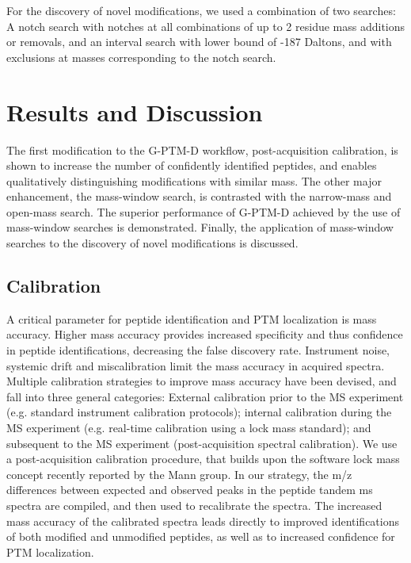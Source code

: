 \documentclass[journal=jprobs,manuscript=article]{achemso}
\begin{document}
For the discovery of novel modifications, we used a combination of two searches: A notch search with notches at all combinations of up to 2 residue mass additions or removals, and an interval search with lower bound of -187 Daltons, and with exclusions at masses corresponding to the notch search.

\section{Results and Discussion}




The first modification to the G-PTM-D workflow, post-acquisition calibration, is shown to increase the number of confidently identified peptides, and enables qualitatively distinguishing modifications with similar mass.
The other major enhancement, the mass-window search, is contrasted with the narrow-mass and open-mass search.
The superior performance of G-PTM-D achieved by the use of mass-window searches is demonstrated.
Finally, the application of mass-window searches to the discovery of novel modifications is discussed.

\subsection{Calibration}

A critical parameter for peptide identification and PTM localization is mass accuracy\cite{Scherl_2008}.
Higher mass accuracy provides increased specificity and thus confidence in peptide identifications, decreasing the false discovery rate.
Instrument noise, systemic drift and miscalibration limit the mass accuracy in acquired spectra.
Multiple calibration strategies to improve mass accuracy have been devised, and fall into three general categories:  External calibration prior to the MS experiment (e.g. standard instrument calibration protocols); internal calibration during the MS experiment (e.g. real-time calibration using a lock mass standard\cite{Olsen_2005}); and subsequent to the MS experiment (post-acquisition spectral calibration).
We use a post-acquisition calibration procedure, that builds upon the software lock mass concept\cite{Cox_2011} recently reported by the Mann group.
In our strategy, the m/z differences between expected and observed peaks in the peptide tandem ms spectra are compiled, and then used to recalibrate the spectra.
The increased mass accuracy of the calibrated spectra leads directly to improved identifications of both modified and unmodified peptides, as well as to increased confidence for PTM localization.
\end{document}
